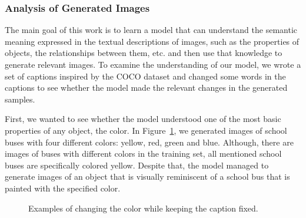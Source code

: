 \documentclass{article} %
\begin{document}
\subsubsection{Analysis of Generated Images}
The main goal of this work is to learn a model that can understand the semantic meaning expressed in the textual descriptions of images, such as the properties of objects, the relationships between them, etc. and then use that knowledge to generate relevant images. To examine the understanding of our model, we wrote a set of captions inspired by the COCO dataset and changed some words in the captions to see whether the model made the relevant changes in the generated samples.

First, we wanted to see whether the model understood one of the most basic properties of any object, the color. In Figure~\ref{fig:genimages1}, we generated images of school buses with four different colors: yellow, red, green and blue. Although, there are images of buses with different colors in the training set, all mentioned school buses are specifically colored yellow. Despite that, the model managed to generate images of an object that is visually reminiscent of a school bus that is painted with the specified color.

\begin{figure}[!h]
\captionsetup[subfigure]{labelformat=empty}
\vspace{-0.3cm}
\begin{center}
\quad
%
\quad
%
\quad
%
\quad
%
\end{center}
\caption{Examples of changing the color while keeping the caption fixed.}
\label{fig:genimages1}
\vspace{-0.3cm}
\end{figure}
\end{document}

